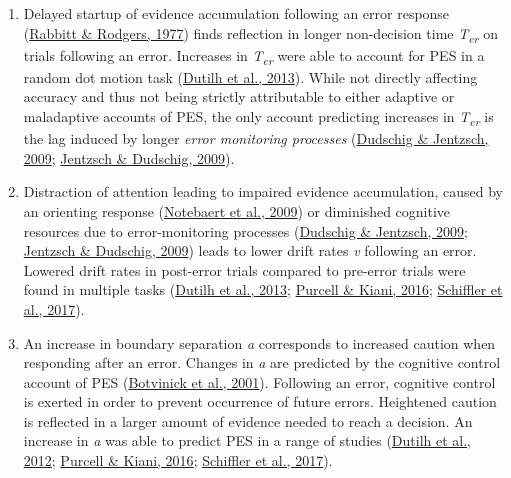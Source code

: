 \documentclass[
  man,floatsintext]{apa7}
\providecommand{\tightlist}{%
  \setlength{\itemsep}{0pt}\setlength{\parskip}{0pt}}
\begin{document}
\begin{enumerate}
\def\labelenumi{(\arabic{enumi})}
\tightlist
\item
  Delayed startup of evidence accumulation following an error response (\protect\hyperlink{ref-rabbitt1977}{Rabbitt \& Rodgers, 1977}) finds reflection in longer non-decision time \emph{T\textsubscript{er}} on trials following an error. Increases in \emph{T\textsubscript{er}} were able to account for PES in a random dot motion task (\protect\hyperlink{ref-dutilh2013}{Dutilh et al., 2013}). While not directly affecting accuracy and thus not being strictly attributable to either adaptive or maladaptive accounts of PES, the only account predicting increases in \emph{T\textsubscript{er}} is the lag induced by longer \emph{error monitoring processes} (\protect\hyperlink{ref-dudschig2009}{Dudschig \& Jentzsch, 2009}; \protect\hyperlink{ref-jentzsch2009}{Jentzsch \& Dudschig, 2009}).
\item
  Distraction of attention leading to impaired evidence accumulation, caused by an orienting response (\protect\hyperlink{ref-notebaert2009}{Notebaert et al., 2009}) or diminished cognitive resources due to error-monitoring processes (\protect\hyperlink{ref-dudschig2009}{Dudschig \& Jentzsch, 2009}; \protect\hyperlink{ref-jentzsch2009}{Jentzsch \& Dudschig, 2009}) leads to lower drift rates \emph{v} following an error. Lowered drift rates in post-error trials compared to pre-error trials were found in multiple tasks (\protect\hyperlink{ref-dutilh2013}{Dutilh et al., 2013}; \protect\hyperlink{ref-purcell2016}{Purcell \& Kiani, 2016}; \protect\hyperlink{ref-schiffler2017}{Schiffler et al., 2017}).
\item
  An increase in boundary separation \emph{a} corresponds to increased caution when responding after an error. Changes in \emph{a} are predicted by the cognitive control account of PES (\protect\hyperlink{ref-botvinick2001}{Botvinick et al., 2001}). Following an error, cognitive control is exerted in order to prevent occurrence of future errors. Heightened caution is reflected in a larger amount of evidence needed to reach a decision. An increase in \emph{a} was able to predict PES in a range of studies (\protect\hyperlink{ref-dutilh2012testing}{Dutilh et al., 2012}; \protect\hyperlink{ref-purcell2016}{Purcell \& Kiani, 2016}; \protect\hyperlink{ref-schiffler2017}{Schiffler et al., 2017}).
\end{enumerate}
\end{document}
